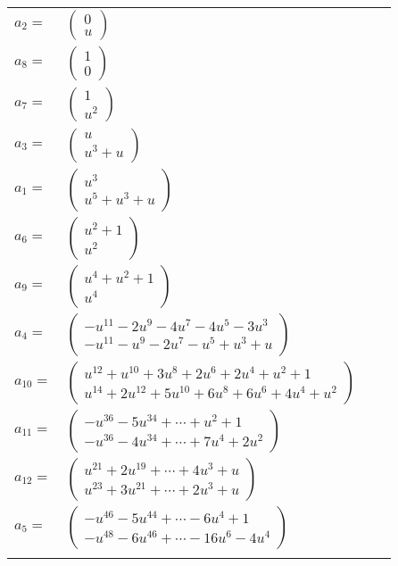 \documentclass[1p]{elsarticle_modified}
\theoremstyle{definition}
\begin{document}
\begin{tabular}{m{7pt} m{180pt} m{7pt} m{180pt} }
\flushright $a_{2}=$&$\begin{pmatrix}0\\u\end{pmatrix}$ \\
\flushright $a_{8}=$&$\begin{pmatrix}1\\0\end{pmatrix}$ \\
\flushright $a_{7}=$&$\begin{pmatrix}1\\u^2\end{pmatrix}$ \\
\flushright $a_{3}=$&$\begin{pmatrix}u\\u^3+u\end{pmatrix}$ \\
\flushright $a_{1}=$&$\begin{pmatrix}u^3\\u^5+u^3+u\end{pmatrix}$ \\
\flushright $a_{6}=$&$\begin{pmatrix}u^2+1\\u^2\end{pmatrix}$ \\
\flushright $a_{9}=$&$\begin{pmatrix}u^4+u^2+1\\u^4\end{pmatrix}$ \\
\flushright $a_{4}=$&$\begin{pmatrix}- u^{11}-2 u^9-4 u^7-4 u^5-3 u^3\\- u^{11}- u^9-2 u^7- u^5+u^3+u\end{pmatrix}$ \\
\flushright $a_{10}=$&$\begin{pmatrix}u^{12}+u^{10}+3 u^8+2 u^6+2 u^4+u^2+1\\u^{14}+2 u^{12}+5 u^{10}+6 u^8+6 u^6+4 u^4+u^2\end{pmatrix}$ \\
\flushright $a_{11}=$&$\begin{pmatrix}- u^{36}-5 u^{34}+\cdots+u^2+1\\- u^{36}-4 u^{34}+\cdots+7 u^4+2 u^2\end{pmatrix}$ \\
\flushright $a_{12}=$&$\begin{pmatrix}u^{21}+2 u^{19}+\cdots+4 u^3+u\\u^{23}+3 u^{21}+\cdots+2 u^3+u\end{pmatrix}$ \\
\flushright $a_{5}=$&$\begin{pmatrix}- u^{46}-5 u^{44}+\cdots-6 u^4+1\\- u^{48}-6 u^{46}+\cdots-16 u^6-4 u^4\end{pmatrix}$\\&\end{tabular}
\end{document}
